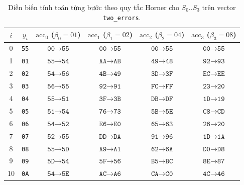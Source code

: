 \begin{table}[!htb]
\centering
\caption{Diễn biến tính toán từng bước theo quy tắc Horner cho $S_0..S_3$ trên vector \texttt{two\_errors}.}
\label{tab:worked_horner}
\scriptsize
\renewcommand{\arraystretch}{1.05}
\begin{tabular}{@{} c c c c c c @{}}
\toprule
$i$ & $y_i$ & $\text{acc}_0$ ($\beta_0=\text{01}$) & $\text{acc}_1$ ($\beta_1=\text{02}$) & $\text{acc}_2$ ($\beta_2=\text{04}$) & $\text{acc}_3$ ($\beta_3=\text{08}$) \\
\midrule
0  & \texttt{55} & $\texttt{00} \to \texttt{55}$ & $\texttt{00} \to \texttt{55}$ & $\texttt{00} \to \texttt{55}$ & $\texttt{00} \to \texttt{55}$ \\
1  & \texttt{01} & $\texttt{55} \to \texttt{54}$ & $\texttt{AA} \to \texttt{AB}$ & $\texttt{49} \to \texttt{48}$ & $\texttt{92} \to \texttt{93}$ \\
2  & \texttt{02} & $\texttt{54} \to \texttt{56}$ & $\texttt{4B} \to \texttt{49}$ & $\texttt{3D} \to \texttt{3F}$ & $\texttt{EC} \to \texttt{EE}$ \\
3  & \texttt{03} & $\texttt{56} \to \texttt{55}$ & $\texttt{92} \to \texttt{91}$ & $\texttt{FC} \to \texttt{FF}$ & $\texttt{23} \to \texttt{20}$ \\
4  & \texttt{04} & $\texttt{55} \to \texttt{51}$ & $\texttt{3F} \to \texttt{3B}$ & $\texttt{DB} \to \texttt{DF}$ & $\texttt{1D} \to \texttt{19}$ \\
5  & \texttt{05} & $\texttt{51} \to \texttt{54}$ & $\texttt{76} \to \texttt{73}$ & $\texttt{5B} \to \texttt{5E}$ & $\texttt{C8} \to \texttt{CD}$ \\
6  & \texttt{06} & $\texttt{54} \to \texttt{52}$ & $\texttt{E6} \to \texttt{E0}$ & $\texttt{65} \to \texttt{63}$ & $\texttt{26} \to \texttt{20}$ \\
7  & \texttt{07} & $\texttt{52} \to \texttt{55}$ & $\texttt{DD} \to \texttt{DA}$ & $\texttt{91} \to \texttt{96}$ & $\texttt{1D} \to \texttt{1A}$ \\
8  & \texttt{08} & $\texttt{55} \to \texttt{5D}$ & $\texttt{A9} \to \texttt{A1}$ & $\texttt{62} \to \texttt{6A}$ & $\texttt{D0} \to \texttt{D8}$ \\
9  & \texttt{09} & $\texttt{5D} \to \texttt{54}$ & $\texttt{5F} \to \texttt{56}$ & $\texttt{B5} \to \texttt{BC}$ & $\texttt{8E} \to \texttt{87}$ \\
10 & \texttt{0A} & $\texttt{54} \to \texttt{5E}$ & $\texttt{AC} \to \texttt{A6}$ & $\texttt{CA} \to \texttt{C0}$ & $\texttt{4C} \to \texttt{46}$ \\

\end{tabular}
\end{table}
